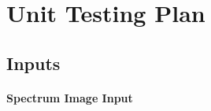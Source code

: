 \documentclass[12pt, titlepage]{article}
\begin{document}
					
					
					
					
					

					

					
					



				
\section{Unit Testing Plan}
\label{sec:UnitTest}

\subsection{Inputs}
		
\paragraph{Spectrum Image Input}
\end{document}
